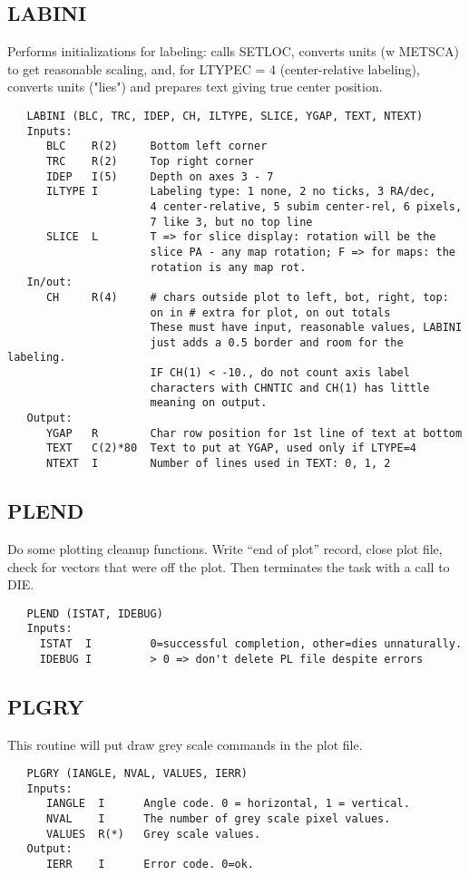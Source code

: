 \subsection{LABINI}
Performs initializations for labeling: calls SETLOC, converts
units (w METSCA) to get reasonable scaling, and, for LTYPEC   = 4
(center-relative labeling), converts units ("lies") and prepares
text giving true center position.
\begin{verbatim}
   LABINI (BLC, TRC, IDEP, CH, ILTYPE, SLICE, YGAP, TEXT, NTEXT)
   Inputs:
      BLC    R(2)     Bottom left corner
      TRC    R(2)     Top right corner
      IDEP   I(5)     Depth on axes 3 - 7
      ILTYPE I        Labeling type: 1 none, 2 no ticks, 3 RA/dec,
                      4 center-relative, 5 subim center-rel, 6 pixels,
                      7 like 3, but no top line
      SLICE  L        T => for slice display: rotation will be the
                      slice PA - any map rotation; F => for maps: the
                      rotation is any map rot.
   In/out:
      CH     R(4)     # chars outside plot to left, bot, right, top:
                      on in # extra for plot, on out totals
                      These must have input, reasonable values, LABINI
                      just adds a 0.5 border and room for the labeling.
                      IF CH(1) < -10., do not count axis label
                      characters with CHNTIC and CH(1) has little
                      meaning on output.
   Output:
      YGAP   R        Char row position for 1st line of text at bottom
      TEXT   C(2)*80  Text to put at YGAP, used only if LTYPE=4
      NTEXT  I        Number of lines used in TEXT: 0, 1, 2

\end{verbatim}

\subsection{PLEND}
Do some plotting cleanup functions.  Write ``end of plot'' record,
close plot file, check for vectors that were off the plot.
Then terminates the task with a call to DIE.
\begin{verbatim}
   PLEND (ISTAT, IDEBUG)
   Inputs:
     ISTAT  I         0=successful completion, other=dies unnaturally.
     IDEBUG I         > 0 => don't delete PL file despite errors

\end{verbatim}

\subsection{PLGRY}
This routine will put draw grey scale commands in the plot file.
\begin{verbatim}
   PLGRY (IANGLE, NVAL, VALUES, IERR)
   Inputs:
      IANGLE  I      Angle code. 0 = horizontal, 1 = vertical.
      NVAL    I      The number of grey scale pixel values.
      VALUES  R(*)   Grey scale values.
   Output:
      IERR    I      Error code. 0=ok.

\end{verbatim}

